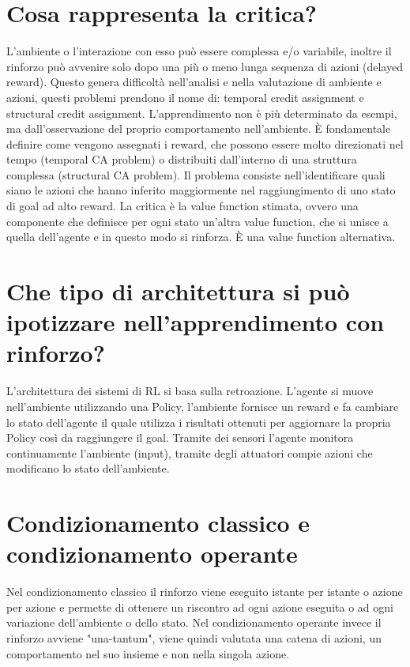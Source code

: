 \documentclass[\main/main.tex]{subfiles}
\begin{document}
\section{Cosa rappresenta la critica?}
L'ambiente o l'interazione con esso può essere complessa e/o variabile, inoltre il rinforzo può avvenire solo dopo una più o meno lunga sequenza di azioni (delayed reward).
Questo genera difficoltà nell'analisi e nella valutazione di ambiente e azioni, questi problemi prendono il nome di: temporal credit assignment e structural credit assignment.
L'apprendimento non è più determinato da esempi, ma dall'osservazione del proprio comportamento nell'ambiente.
È fondamentale definire come vengono assegnati i reward, che possono essere molto direzionati nel tempo (temporal CA problem) o distribuiti dall'interno di una struttura complessa (structural CA problem).
Il problema consiste nell'identificare quali siano le azioni che hanno inferito maggiormente nel raggiungimento di uno stato di goal ad alto reward.
La critica è la value function stimata, ovvero una componente che definisce per ogni stato un'altra value function, che si unisce a quella dell'agente e in questo modo si rinforza. È una value function alternativa.

\section{Che tipo di architettura si può ipotizzare nell'apprendimento con rinforzo?}
L'architettura dei sistemi di RL si basa sulla retroazione. L'agente si muove nell'ambiente utilizzando una Policy, l'ambiente fornisce un reward e fa cambiare lo stato dell'agente il quale utilizza i risultati ottenuti per aggiornare la propria Policy così da raggiungere il goal.
Tramite dei sensori l'agente monitora continuamente l'ambiente (input), tramite degli attuatori compie azioni che modificano lo stato dell'ambiente.

\section{Condizionamento classico e condizionamento operante}
Nel condizionamento classico il rinforzo viene eseguito istante per istante o azione per azione e permette di ottenere un riscontro ad ogni azione eseguita o ad ogni variazione dell'ambiente o dello stato.
Nel condizionamento operante invece il rinforzo avviene "una-tantum", viene quindi valutata una catena di azioni, un comportamento nel suo insieme e non nella singola azione.
\end{document}
